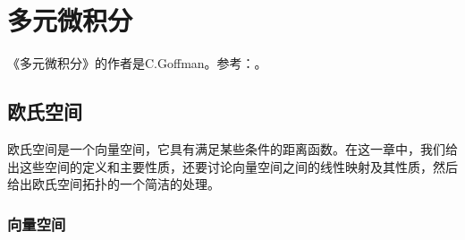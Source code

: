 \chapter{多元微积分}
《多元微积分》的作者是C.Goffman。参考：\cite{CalculusOfMultiVariables1978}。

\section{欧氏空间}\label{section00301}
欧氏空间是一个向量空间，它具有满足某些条件的距离函数。在这一章中，我们给出这些空间的定义和主要性质，还要讨论向量空间之间的线性映射及其性质，然后给出欧氏空间拓扑的一个简洁的处理。


\subsection{向量空间}\label{subsection0030101}








